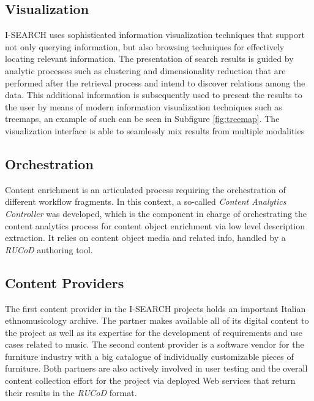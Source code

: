 \documentclass{www2012-comp-accepted}
\let\oldemph\emph
\renewcommand{\emph}[1]{\oldemph{\fontsize{9}{9}\selectfont #1}}
\begin{document}
\subsection{Visualization}
\mbox{I-SEARCH} uses sophisticated information visualization techniques that support not only querying information, but also browsing techniques for effectively locating relevant information.
The presentation of search results is guided by analytic processes such as clustering and dimensionality reduction that are performed after the retrieval process and intend to discover relations among the data.
This additional information is subsequently used to present the results to the user by means of modern information visualization techniques such as treemaps, an example of such can be seen in Subfigure \autoref{fig:treemap}.
The visualization interface is able to seamlessly mix results from multiple modalities
 
\subsection{Orchestration}
Content enrichment is an articulated process requiring the orchestration of different workflow fragments.
In this context, a so-called \emph{Content Analytics Controller} was developed, which is the component in charge of orchestrating the content analytics process for content object enrichment via low level description extraction.
It relies on content object media and related info, handled by a \mbox{\emph{RUCoD}} authoring tool.

\subsection{Content Providers}
The first content provider in the \mbox{I-SEARCH} projects holds an important Italian ethnomusicology archive.
The partner makes available all of its digital content to the project as well as its expertise for the development of requirements and use cases related to music.
The second content provider is a software vendor for the furniture industry with a big catalogue of individually customizable pieces of furniture. 
Both partners are also actively involved in user testing and the overall content collection effort for the project via deployed Web services that return their results in the \mbox{\emph{RUCoD}} format.
\end{document}
